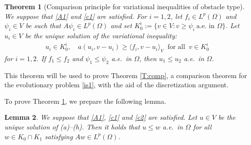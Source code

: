 \documentclass[reqno,10pt]{amsart}
\newtheorem{Th}{Theorem}[section]
\newtheorem{Lem}[Th]{Lemma}
\begin{document}
\begin{Th}[Comparison principle for variational inequalities of obstacle
 type]\label{T:comp-ell}
We suppose that \eqref{A1} and \eqref{c1} are satisfied. 
For $i=1,2$, let $f_i\in L^p(\Omega)$ and $\psi_i\in V$ be such that
 $A\psi_i \in L^p(\Omega)$ and set $K_0^i:=\{ v\in V \colon v\ge
 \psi_i~\mbox{a.e.~in~}\Omega \}$.
Let $u_i\in V$ be the unique solution of the variational inequality\/{\rm :}
\begin{align}\label{ivi}
u_i\in K_0^i,
\quad
a(u_i,v-u_i)\ge \langle f_i,v-u_i\rangle_V \ \mbox{ for all } \ v\in
K_0^i
\end{align}
for $i = 1,2$.
If $f_1\le f_2$ and $\psi_1\le \psi_2$ a.e.~in $\Omega$,
then $u_1\le u_2$ a.e.~in $\Omega$.
\end{Th}

This theorem will be used to prove Theorem \ref{T:comp}, a comparison
theorem for the evolutionary problem \eqref{is1}, with the aid of the
discretization argument. 

To prove Theorem \ref{T:comp-ell}, we prepare the following lemma.

\begin{Lem}\label{lem-cp-vi}
We suppose that \eqref{A1}, \eqref{c1} and \eqref{c2} are satisfied. 
Let $u \in V$ be the unique solution of {\rm (a)--(h)}.
Then it holds that $u\le w$ a.e.~in $\Omega$ for all $w\in K_0\cap K_1$
 satisfying $Aw \in L^p(\Omega)$.
\end{Lem}
\end{document}
